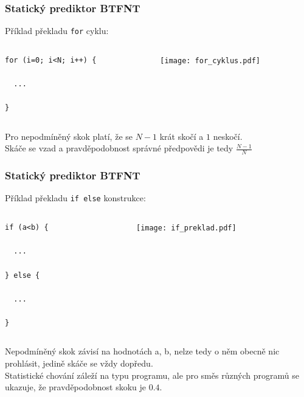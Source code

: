 \documentclass{beamer}
\begin{document}
\begin{frame}[fragile]
\frametitle{Statický prediktor BTFNT}

Příklad překladu \texttt{for} cyklu:

\begin{columns}[T]
\begin{column}{0.4\textwidth}
\begin{verbatim}
for (i=0; i<N; i++) {

  ...
  
}
\end{verbatim}
\end{column}
\begin{column}{0.6\textwidth}
\texttt{[image: for\_cyklus.pdf]}
\end{column}
\end{columns}
\bigskip
Pro nepodmíněný skok platí, že se $N-1$ krát skočí a $1$ neskočí.\\
Skáče se vzad a pravděpodobnost správné předpovědi je tedy $\frac{N-1}{N}$

\end{frame}

\begin{frame}[fragile]
\frametitle{Statický prediktor BTFNT}

Příklad překladu \texttt{if else} konstrukce:

\begin{columns}[T]
\begin{column}{0.4\textwidth}
\begin{verbatim}
if (a<b) {
  
  ...

} else {

  ...

}
\end{verbatim}
\end{column}
\begin{column}{0.6\textwidth}
\texttt{[image: if\_preklad.pdf]}
\end{column}
\end{columns}
\bigskip
Nepodmíněný skok závisí na hodnotách a, b, nelze tedy o něm obecně nic prohlásit, jedině skáče se vždy dopředu.\\
Statistické chování záleží na typu programu, ale pro směs různých programů se ukazuje, že pravděpodobnost skoku je $0.4$.

\end{frame}
\end{document}
